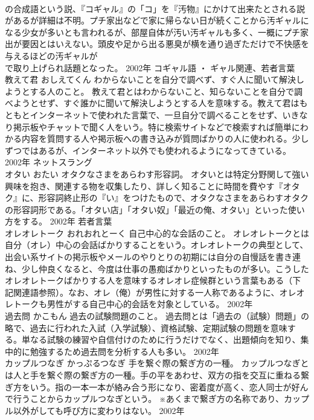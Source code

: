 \documentclass[8pt]{extreport}
\begin{document}
\begin{CJK}{UTF8}{min}
\\	の合成語という説、『コギャル』の「コ」を『汚物』にかけて出来たとされる説があるが詳細は不明。プチ家出などで家に帰らない日が続くことから汚ギャルになる少女が多いとも言われるが、部屋自体が汚い汚ギャルも多く、一概にプチ家出が要因とはいえない。頭皮や足から出る悪臭が横を通り過ぎただけで不快感を与えるほどの汚ギャルが
\\	で取り上げられ話題となった。	2002年	コギャル語 ・ ギャル関連、若者言葉	
\\	教えて君	おしえてくん	わからないことを自分で調べず、すぐ人に聞いて解決しようとする人のこと。	教えて君とはわからないこと、知らないことを自分で調べようとせず、すぐ誰かに聞いて解決しようとする人を意味する。教えて君はもともとインターネットで使われた言葉で、一旦自分で調べることをせず、いきなり掲示板やチャットで聞く人をいう。特に検索サイトなどで検索すれば簡単にわかる内容を質問する人や掲示板への書き込みが質問ばかりの人に使われる。少しずつではあるが、インターネット以外でも使われるようになってきている。	2002年	ネットスラング	
\\	オタい	おたい	オタクなさまをあらわす形容詞。	オタいとは特定分野関して強い興味を抱き、関連する物を収集したり、詳しく知ることに時間を費やす『オタク』に、形容詞終止形の『い』をつけたもので、オタクなさまをあらわすオタクの形容詞形である。「オタい店」「オタい奴」「最近の俺、オタい」といった使い方をする。	2002年	若者言葉	
\\	オレオレトーク	おれおれとーく	自己中心的な会話のこと。	オレオレトークとは自分（オレ）中心の会話ばかりすることをいう。オレオレトークの典型として、出会い系サイトの掲示板やメールのやりとりの初期には自分の自慢話を書き連ね、少し仲良くなると、今度は仕事の愚痴ばかりといったものが多い。こうしたオレオレトークばかりする人を意味するオレオレ症候群という言葉もある（下記関連語参照）。なお、オレ（俺）が男性に対する一人称であるように、オレオレトークも男性がする自己中心的会話を対象としている。	2002年	
\\	過去問	かこもん	過去の試験問題のこと。	過去問とは「過去の（試験）問題」の略で、過去に行われた入試（入学試験）、資格試験、定期試験の問題を意味する。単なる試験の練習や自信付けのために行うだけでなく、出題傾向を知り、集中的に勉強するため過去問を分析する人も多い。	2002年	
\\	カップルつなぎ	かっぷるつなぎ	手を繋ぐ際の繋ぎ方の一種。	カップルつなぎとは人と手を繋ぐ際の繋ぎ方の一種。手の平をあわせ、双方の指を交互に重ねる繋ぎ方をいう。指の一本一本が絡み合う形になり、密着度が高く、恋人同士が好んで行うことからカップルつなぎという。 ※あくまで繋ぎ方の名称であり、カップル以外がしても呼び方に変わりはない。	2002年	

\end{CJK}
\end{document}
